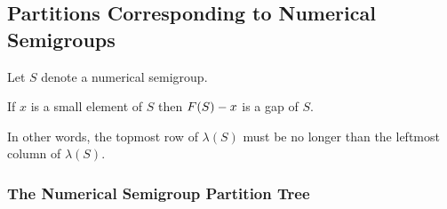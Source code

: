 \begin{landscape}
\begin{center}
\end{center}
\end{landscape}
\newpage

\subsection{Partitions Corresponding to Numerical Semigroups}
Let \(S\) denote a numerical semigroup.

\begin{remark}
    If \(x\) is a small element of \(S\) then \(F(S) - x\) is a gap of \(S\).
\end{remark}

In other words, the topmost row of \(\lambda(S)\) must be no longer than the leftmost column of \(\lambda(S)\). 

\subsubsection{The Numerical Semigroup Partition Tree}

